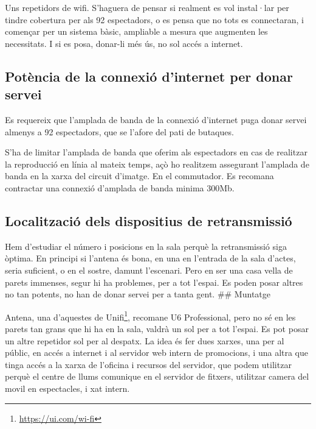 \documentclass[
  10pt,
]{krantz}
\DeclareRobustCommand{\href}[2]{#2\footnote{\url{#1}}}
\begin{document}
Uns repetidors de wifi. S'haguera de pensar si realment es vol instal·lar per tindre cobertura per als 92 espectadors, o es pensa que no tots es connectaran, i començar per un sistema bàsic, ampliable a mesura que augmenten les necessitats. I si es posa, donar-li més ús, no sol accés a internet.

\hypertarget{potuxe8ncia-de-la-connexiuxf3-dinternet-per-donar-servei}{%
\subsection{Potència de la connexió d'internet per donar servei}\label{potuxe8ncia-de-la-connexiuxf3-dinternet-per-donar-servei}}

Es requereix que l'amplada de banda de la connexió d'internet puga donar servei almenys a 92 espectadors, que se l'afore del pati de butaques.

S'ha de limitar l'amplada de banda que oferim als espectadors en cas de realitzar la reproducció en línia al mateix temps, açò ho realitzem assegurant l'amplada de banda en la xarxa del circuit d'imatge. En el commutador. Es recomana contractar una connexió d'amplada de banda minima 300Mb.

\hypertarget{localitzaciuxf3-dels-dispositius-de-retransmissiuxf3}{%
\subsection{Localització dels dispositius de retransmissió}\label{localitzaciuxf3-dels-dispositius-de-retransmissiuxf3}}

Hem d'estudiar el número i posicions en la sala perquè la retransmissió siga òptima. En principi si l'antena és bona, en una en l'entrada de la sala d'actes, seria suficient, o en el sostre, damunt l'escenari. Pero en ser una casa vella de parets immenses, segur hi ha problemes, per a tot l'espai. Es poden posar altres no tan potents, no han de donar servei per a tanta gent. \#\# Muntatge

Antena, una d'aquestes de \href{https://ui.com/wi-fi}{Unifi}, recomane U6 Professional, pero no sé en les parets tan grans que hi ha en la sala, valdrà un sol per a tot l'espai. Es pot posar un altre repetidor sol per al despatx. La idea és fer dues xarxes, una per al públic, en accés a internet i al servidor web intern de promocions, i una altra que tinga accés a la xarxa de l'oficina i recursos del servidor, que podem utilitzar perquè el centre de llums comunique en el servidor de fitxers, utilitzar camera del movil en espectacles, i xat intern.
\end{document}
